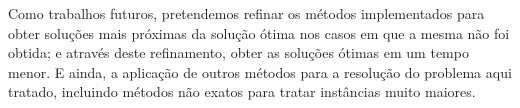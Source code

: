 \documentclass{article}
\begin{document}
	Como trabalhos futuros, pretendemos refinar os métodos implementados para obter soluções mais próximas da solução ótima nos casos em que a mesma não foi obtida; e através deste refinamento, obter as soluções ótimas em um tempo menor. E ainda, a aplicação de outros métodos para a resolução do problema aqui tratado, incluindo métodos não exatos para tratar instâncias muito maiores.
	



\end{document}

